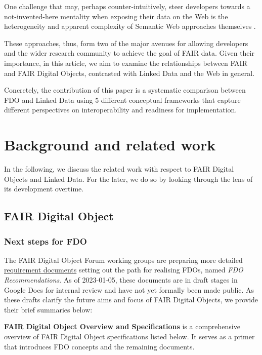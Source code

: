 \documentclass[fleqn,10pt,lineno]{wlpeerj}
\begin{document}
One challenge that may, perhaps counter-intuitively, steer developers towards a not-invented-here mentality \cite{uxWjmlio,v0WwFHgT} when exposing their data on the Web is the heterogeneity and apparent complexity of Semantic Web approaches themselves \cite{5V3GqSzR}.

These approaches, thus, form two of the major avenues for allowing developers and the wider research community to achieve the goal of FAIR data. Given their importance, in this article, we aim to examine the relationships between FAIR and FAIR Digital Objects, contrasted with Linked Data and the Web in general.

Concretely, the contribution of this paper is a systematic comparison between FDO and Linked Data using 5 different conceptual frameworks that capture different perspectives on interoperability and readiness for implementation.

\hypertarget{sec:background}{%
\section*{Background and related work}\label{sec:background}}

In the following, we discuss the related work with respect to FAIR Digital Objects and Linked Data. For the later, we do so by looking through the lens of its development overtime.

\hypertarget{sec:fdo}{%
\subsection*{FAIR Digital Object}\label{sec:fdo}}

\hypertarget{sec:next-step-fdo}{%
\subsubsection*{Next steps for FDO}\label{sec:next-step-fdo}}

The FAIR Digital Object Forum \cite{DMEBhHID} working groups are preparing more detailed \href{https://docs.google.com/spreadsheets/d/1O1PTLmVWqjQgvJsIcPgaZJe9BntHZt8_QndEG0eRwUY/edit}{requirement documents} setting out the path for realising FDOs, named \emph{FDO Recommendations}. As of 2023-01-05, these documents are in draft stages in Google Docs for internal review and have not yet formally been made public. As these drafts clarify the future aims and focus of FAIR Digital Objects, we provide their brief summaries below:

\textbf{FAIR Digital Object Overview and Specifications} \cite{11NpETLq1} is a comprehensive overview of FAIR Digital Object specifications listed below. It serves as a primer that introduces FDO concepts and the remaining documents.
\end{document}
